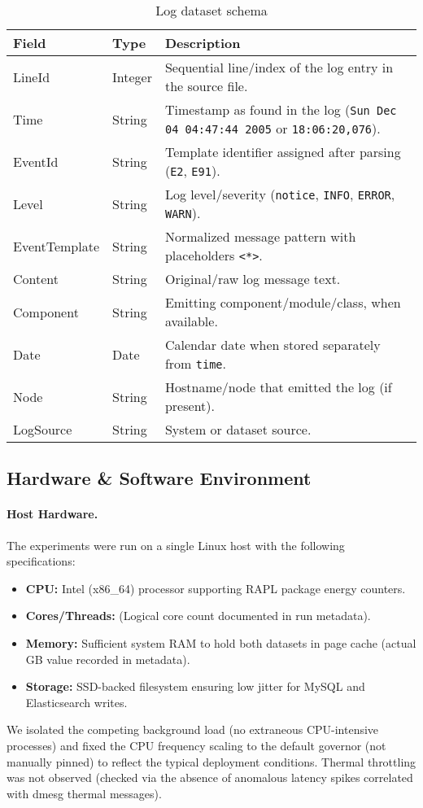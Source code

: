 \begin{table}[htbp]
\centering
\footnotesize
\caption{Log dataset schema}
\label{tab:dataset-schema}
\begin{tabularx}{\linewidth}{@{}l l X@{}}
\toprule
\textbf{Field} & \textbf{Type} & \textbf{Description} \\
\midrule
LineId & Integer & Sequential line/index of the log entry in the source file. \\
Time & String & Timestamp as found in the log (\texttt{Sun Dec 04 04:47:44 2005} or \texttt{18:06:20,076}). \\
EventId & String & Template identifier assigned after parsing (\texttt{E2}, \texttt{E91}). \\
Level & String & Log level/severity (\texttt{notice}, \texttt{INFO}, \texttt{ERROR}, \texttt{WARN}). \\
EventTemplate & String & Normalized message pattern with placeholders \texttt{<*>}. \\
Content & String & Original/raw log message text. \\
Component & String & Emitting component/module/class, when available. \\
Date & Date & Calendar date when stored separately from \texttt{time}. \\
Node & String & Hostname/node that emitted the log (if present). \\
LogSource & String & System or dataset source. \\
\bottomrule
\end{tabularx}
\end{table}




\subsection{Hardware \& Software Environment}
\label{s:hardware-software}

\paragraph{Host Hardware.} The experiments were run on a single Linux host with the following specifications:
\begin{itemize}
  \item \textbf{CPU:} Intel (x86\_64) processor supporting RAPL package energy counters.
  \item \textbf{Cores/Threads:} (Logical core count documented in run metadata).
  \item \textbf{Memory:} Sufficient system RAM to hold both datasets in page cache (actual GB value recorded in metadata).
  \item \textbf{Storage:} SSD-backed filesystem ensuring low jitter for MySQL and Elasticsearch writes.
\end{itemize}
We isolated the competing background load (no extraneous CPU-intensive processes) and fixed the CPU frequency scaling to the default governor (not manually pinned) to reflect the typical deployment conditions. Thermal throttling was not observed (checked via the absence of anomalous latency spikes correlated with dmesg thermal messages).

